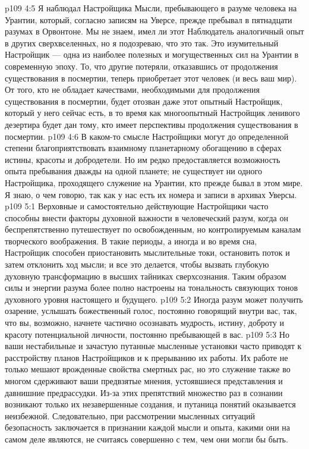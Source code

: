 \vs p109 4:5 \pc Я наблюдал Настройщика Мысли, пребывающего в разуме человека на Урантии, который, согласно записям на Уверсе, прежде пребывал в пятнадцати разумах в Орвонтоне. Мы не знаем, имел ли этот Наблюдатель аналогичный опыт в других сверхвселенных, но я подозреваю, что это так. Это изумительный Настройщик --- одна из наиболее полезных и могущественных сил на Урантии в современную эпоху. То, что другие потеряли, отказавшись от продолжения существования в посмертии, теперь приобретает этот человек (и весь ваш мир). От того, кто не обладает качествами, необходимыми для продолжения существования в посмертии, будет отозван даже этот опытный Настройщик, который у него сейчас есть, в то время как многоопытный Настройщик ленивого дезертира будет дан тому, кто имеет перспективы продолжения существования в посмертии.
\vs p109 4:6 В каком\hyp{}то смысле Настройщики могут до определенной степени благоприятствовать взаимному планетарному обогащению в сферах истины, красоты и добродетели. Но им редко предоставляется возможность опыта пребывания дважды на одной планете; не существует ни одного Настройщика, проходящего служение на Урантии, кто прежде бывал в этом мире. Я знаю, о чем говорю, так как у нас есть их номера и записи в архивах Уверсы.
\vs p109 5:1 Верховные и самостоятельно действующие Настройщики часто способны внести факторы духовной важности в человеческий разум, когда он беспрепятственно путешествует по освобожденным, но контролируемым каналам творческого воображения. В такие периоды, а иногда и во время сна, Настройщик способен приостановить мыслительные токи, остановить поток и затем отклонить ход мысли; и все это делается, чтобы вызвать глубокую духовную трансформацию в высших тайниках сверхсознания. Таким образом силы и энергии разума более полно настроены на тональность связующих тонов духовного уровня настоящего и будущего.
\vs p109 5:2 Иногда разум может получить озарение, услышать божественный голос, постоянно говорящий внутри вас, так, что вы, возможно, начнете частично осознавать мудрость, истину, доброту и красоту потенциальной личности, постоянно пребывающей в вас.
\vs p109 5:3 Но ваши нестабильные и зачастую путанные мысленные установки часто приводят к расстройству планов Настройщиков и к прерыванию их работы. Их работе не только мешают врожденные свойства смертных рас, но это служение также во многом сдерживают ваши предвзятые мнения, устоявшиеся представления и давнишние предрассудки. Из\hyp{}за этих препятствий множество раз в сознании возникают только их незавершенные создания, и путаница понятий оказывается неизбежной. Следовательно, при рассмотрении мысленных ситуаций безопасность заключается в признании каждой мысли и опыта, какими они на самом деле являются, не считаясь совершенно с тем, чем они могли бы быть.

